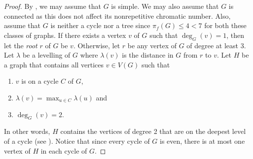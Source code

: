 \documentclass{cccg16}
\begin{document}
\begin{proof}
 By , we may assume that $G$ is simple.  We may also
 assume that $G$ is connected as this does not affect its nonrepetitive
 chromatic number. Also, assume that $G$ is neither a cycle nor a
 tree since $\pi_f(G) \leq 4 < 7$ for both these classes of graphs.
 If there exists a vertex $v$ of $G$ such that $\deg_G(v)=1$, then let
 the \emph{root} $r$ of $G$ be $v$. Otherwise, let $r$ be any vertex
 of $G$ of degree at least $3$. Let $\lambda$ be a levelling of $G$
 where $\lambda(v)$ is the distance in $G$ from $r$ to $v$. Let $H$
 be a graph that contains all vertices $v\in V(G)$ such that
 \begin{enumerate}
  \item $v$ is on a cycle $C$ of $G$,
  \item $\lambda(v)=\max_{u \in C} \lambda(u)$ and
  \item $\deg_G(v)=2$.
 \end{enumerate} 
 In other words, $H$ contains the vertices of degree 2 that are on the
 deepest level of a cycle (see ). Notice that
 since every cycle of $G$ is even, there is at most one vertex of $H$
 in each cycle of $G$.


\end{proof}
\end{document}
